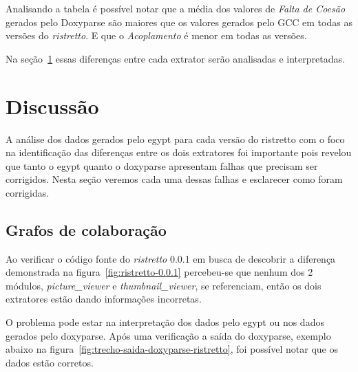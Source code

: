 Analisando a tabela é possível notar que a média dos valores de {\it Falta de
Coesão} gerados pelo Doxyparse são maiores que os valores gerados pelo GCC em
todas as versões do {\it ristretto}. E que o {\it Acoplamento} é menor em todas
as versões.

Na seção~\ref{sec:discussao} essas diferenças entre cada extrator serão
analisadas e interpretadas.

\section{Discussão} \label{sec:discussao}


A análise dos dados gerados pelo egypt para cada versão do ristretto com o foco
na identificação das diferenças entre os dois extratores foi importante pois
revelou que tanto o egypt quanto o doxyparse apresentam falhas que precisam ser
corrigidos. Nesta seção veremos cada uma dessas falhas e esclarecer como foram
corrigidas.

\subsection{Grafos de colaboração}

Ao verificar o código fonte do {\it ristretto} 0.0.1 em busca de descobrir a
diferença demonstrada na figura~\ref{fig:ristretto-0.0.1} percebeu-se que
nenhum dos 2 módulos, {\it picture\_viewer} e {\it thumbnail\_viewer}, se
referenciam, então os dois extratores estão dando informações incorretas.

O problema pode estar na interpretação dos dados pelo egypt ou nos dados
gerados pelo doxyparse. Após uma verificação a saída do doxyparse, exemplo
abaixo na figura~\ref{fig:trecho-saida-doxyparse-ristretto}, foi possível notar
que os dados estão corretos.

